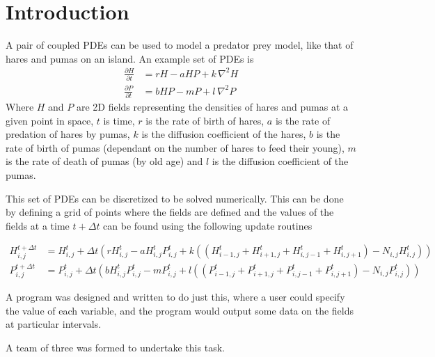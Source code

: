 \section{Introduction}
A pair of coupled PDEs can be used to model a predator prey model, like
that of hares and pumas on an island.
An example set of PDEs is
\begin{align*}
  \frac{\partial{H}}{\partial{t}} &= rH - aHP + k\,{\nabla^2}H \\
  \frac{\partial{P}}{\partial{t}} &= bHP - mP + l\,{\nabla^2}P
\end{align*}
Where $H$ and $P$ are 2D fields representing the densities of hares and pumas
at a given point in space,
$t$ is time,
$r$ is the rate of birth of hares,
$a$ is the rate of predation of hares by pumas,
$k$ is the diffusion coefficient of the hares,
$b$ is the rate of birth of pumas (dependant on the number of hares to
    feed their young),
$m$ is the rate of death of pumas (by old age) and
$l$ is the diffusion coefficient of the pumas.

This set of PDEs can be discretized to be solved numerically.
This can be done by defining a grid of points where the fields are
defined and the values of the fields at a time $t + \Delta{t}$ can
be found using the following update routines

\begin{align*}
  H^{t+\Delta{t}}_{i,j} &= H^{t}_{i,j}
       + \Delta{t}(
           rH^{t}_{i,j} - a H^{t}_{i,j} P^{t}_{i,j}
           + k (
             (H^{t}_{i-1,j} + H^{t}_{i+1,j} + H^{t}_{i,j-1} + H^{t}_{i,j+1})
             -N_{i,j} H^{t}_{i,j}
           )
         ) \\
%
  P^{t+\Delta{t}}_{i,j} &= P^{t}_{i,j}
       + \Delta{t}(
           b H^{t}_{i,j} P^{t}_{i,j} - mP^{t}_{i,j}
           + l (
             (P^{t}_{i-1,j} + P^{t}_{i+1,j} + P^{t}_{i,j-1} + P^{t}_{i,j+1})
             -N_{i,j} P^{t}_{i,j}
           )
         )
\end{align*}

A program was designed and written to do just this, where a user could
specify the value of each variable, and the program would output some
data on the fields at particular intervals.

A team of three was formed to undertake this task.

